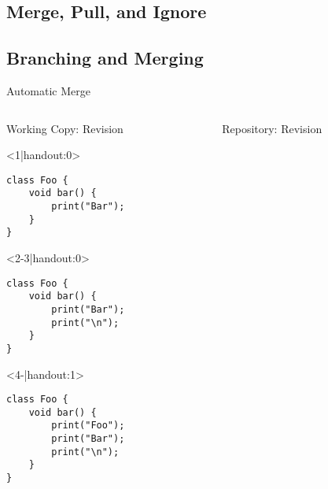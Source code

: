 \subsection{Merge, Pull, and Ignore}
\slideMergePull

\slideIgnore

\subsection{Branching and Merging}
\begin{frame}{\insertsubsection}
	\slideBranchingAndMerging
\end{frame}

\begin{frame}[fragile]{Automatic Merge}
	\begin{columns}[onlytextwidth]
		\begin{column}{0.6\linewidth}
			\begin{columns}[T]
				\begin{column}{0.5\linewidth}
					Working Copy: Revision \only<4>{\emph{11$^*$}}\\[2mm]
					
					\begin{onlyenv}<1|handout:0>
						\begin{lstlisting}[style=java,basicstyle=\fontfamily{pcr}\small\selectfont,numbers=none,escapechar=|]
class Foo {
	void bar() {
		print("Bar");
	}
}	
						\end{lstlisting}
					\end{onlyenv}
					\begin{onlyenv}
						\begin{lstlisting}[style=java,basicstyle=\fontfamily{pcr}\small\selectfont,numbers=none,escapechar=|]
class Foo {
	void bar() {
		print("Bar");
		print("\n");
	}
}	
						\end{lstlisting}
					\end{onlyenv}
					\begin{onlyenv}
						\begin{lstlisting}[style=java,basicstyle=\fontfamily{pcr}\small\selectfont,numbers=none,escapechar=|]
class Foo {
	void bar() {
		print("Foo");
		print("Bar");
		print("\n");
	}
}	
						\end{lstlisting}
					\end{onlyenv}
				\end{column}
				\begin{column}{0.5\linewidth}					
					Repository: Revision \only<3->{\emph{11}}
					

\end{column}
\end{columns}
\end{column}
\end{columns}
\end{frame}
